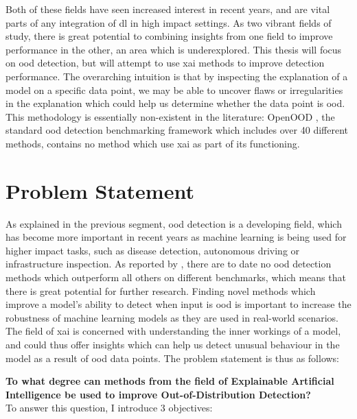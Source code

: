 \documentclass[UKenglish]{uiomasterthesis} %
\theoremstyle{definition}
\begin{document}
Both of these fields have seen increased interest in recent years, and are vital parts of any integration of \ac{dl} in high impact settings. As two vibrant fields of study, there is great potential to combining insights from one field to improve performance in the other, an area which is underexplored. This thesis will focus on \ac{ood} detection, but will attempt to use \ac{xai} methods to improve detection performance. The overarching intuition is that by inspecting the explanation of a model on a specific data point, we may be able to uncover flaws or irregularities in the explanation which could help us determine whether the data point is \ac{ood}. This methodology is essentially non-existent in the literature: OpenOOD \cite{openood, openood15}, the standard \ac{ood} detection benchmarking framework which includes over 40 different methods, contains no method which use \ac{xai} as part of its functioning.

\section{Problem Statement} \label{section:problemstatement}

As explained in the previous segment, \ac{ood} detection is a developing field, which has become more important in recent years as machine learning is being used for higher impact tasks, such as disease detection, autonomous driving or infrastructure inspection. As reported by \cite{openood15}, there are to date no \ac{ood} detection methods which outperform all others on different benchmarks, which means that there is great potential for further research. Finding novel methods which improve a model's ability to detect when input is \ac{ood} is important to increase the robustness of machine learning models as they are used in real-world scenarios. The field of \ac{xai} is concerned with understanding the inner workings of a model, and could thus offer insights which can help us detect unusual behaviour in the model as a result of \ac{ood} data points. The problem statement is thus as follows:

\textbf{To what degree can methods from the field of Explainable Artificial Intelligence be used to improve Out-of-Distribution Detection?}
\\

To answer this question, I introduce 3 objectives:
\end{document}
